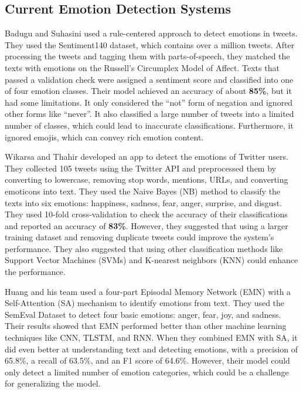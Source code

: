 \documentclass[11pt]{article}
\begin{document}
\begin{multicols*}{2}
    \subsection*{Current Emotion Detection Systems}
    \par Badugu and Suhasini used a rule-centered approach to detect emotions in tweets. They used the Sentiment140 dataset, which contains over a million tweets. After processing the tweets and tagging them with parts-of-speech, they matched the texts with emotions on the Russell’s Circumplex Model of Affect. Texts that passed a validation check were assigned a sentiment score and classified into one of four emotion classes. Their model achieved an accuracy of about \textbf{85\%}, but it had some limitations. It only considered the “not” form of negation and ignored other forms like “never”. It also classified a large number of tweets into a limited number of classes, which could lead to inaccurate classifications. Furthermore, it ignored emojis, which can convey rich emotion content.\cite{badugu2017emotion}
    \par Wikarsa and Thahir developed an app to detect the emotions of Twitter users. They collected 105 tweets using the Twitter API and preprocessed them by converting to lowercase, removing stop words, mentions, URLs, and converting emoticons into text. They used the Naive Bayes (NB) method to classify the texts into six emotions: happiness, sadness, fear, anger, surprise, and disgust. They used 10-fold cross-validation to check the accuracy of their classifications and reported an accuracy of \textbf{83\%}. However, they suggested that using a larger training dataset and removing duplicate tweets could improve the system’s performance. They also suggested that using other classification methods like Support Vector Machines (SVMs) and K-nearest neighbors (KNN) could enhance the performance.
    \par Huang and his team used a four-part Episodal Memory Network (EMN) with a Self-Attention (SA) mechanism to identify emotions from text. They used the SemEval Dataset to detect four basic emotions: anger, fear, joy, and sadness. Their results showed that EMN performed better than other machine learning techniques like CNN, TLSTM, and RNN. When they combined EMN with SA, it did even better at understanding text and detecting emotions, with a precision of 65.8\%, a recall of 63.5\%, and an F1 score of 64.6\%. However, their model could only detect a limited number of emotion categories, which could be a challenge for generalizing the model.

\end{multicols*}
\end{document}
